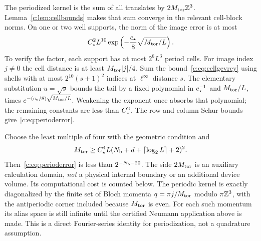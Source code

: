 The periodized kernel is the sum of all translates by $2M_{\rm tor}\mathbb Z^3$.
Lemma~\ref{c:lem:cellbounds} makes that sum converge in the relevant
cell-block norms. On one or two well supports, the norm of the image
error is at most
\begin{equation}
 C_\star^2 L^{10}
       \exp\left(-\frac{c_\star}{8}\sqrt{M_{\rm tor}/L}\right).
                                                               \label{c:eq:perioderror}
\end{equation}
To verify the factor, each support has at most $2^6L^3$ period cells.
For image index $j\ne0$ the cell distance is at least
$M_{\rm tor}|j|/4$. Sum the bound~\eqref{c:eq:cellgevrey} using shells with at
most $2^{10}(s+1)^2$ indices at $\ell^\infty$ distance $s$.
The elementary substitution $u=\sqrt s$ bounds the tail by a fixed
polynomial in $c_\star^{-1}$ and $M_{\rm tor}/L$, times
$e^{-(c_\star/8)\sqrt{M_{\rm tor}/L}}$. Weakening the exponent once absorbs that
polynomial; the remaining constants are less than $C_\star^2$.
The row and column Schur bounds give~\eqref{c:eq:perioderror}.

Choose the least multiple of four with the geometric condition and
\begin{equation}
 M_{\rm tor}\ge C_\star^4 L(N_{\rm b}+d+\lceil\log_2L\rceil+2)^2.
                                                               \label{c:eq:Mcalibration}
\end{equation}
Then~\eqref{c:eq:perioderror} is less than $2^{-N_{\rm b}-20}$.
The side $2M_{\rm tor}$ is an auxiliary calculation domain, \emph{not} a
physical internal boundary or an additional device volume. Its
computational cost is counted below. The periodic kernel is exactly
diagonalized by the finite set of Bloch momenta $q=\pi j/M_{\rm tor}$ modulo
$\pi\mathbb Z^3$, with the antiperiodic corner included because $M_{\rm tor}$ is even.
For each such momentum its alias space is still infinite until the
certified Neumann application above is made. This is a direct
Fourier-series identity for periodization, not a quadrature assumption.

